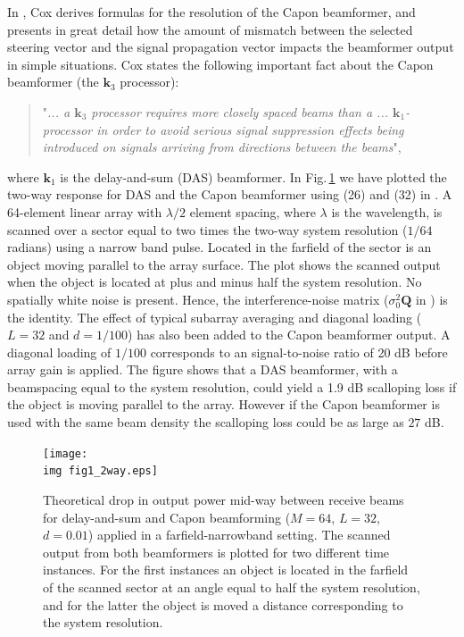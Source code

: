 \documentclass[journal]{IEEEtran}
\newcommand{\mat}[1]{\mathbf{#1}}
\renewcommand{\vec}[1]{\mathbf{#1}}
\newcommand{\img}{img/}
\begin{document}
In \cite{Cox1973}, Cox derives formulas for the resolution of the Capon beamformer, and presents in great detail how the amount of mismatch between the selected steering vector and the signal propagation vector impacts the beamformer output in simple situations. Cox states the following important fact about the Capon beamformer (the $\vec{k}_3$ processor): 
\begin{quote}
"\textit{... a $\vec{k}_3$ processor requires more closely spaced beams than a ... $\vec{k}_1$-processor in order to avoid serious signal suppression effects being introduced on signals arriving from directions between the beams}", 
\end{quote}
where $\vec{k}_1$ is the delay-and-sum (DAS) beamformer. In Fig.\,\ref{fig:das_capon_beams} we have plotted the two-way response for DAS and the Capon beamformer using (26) and (32) in \cite{Cox1973}. A 64-element linear array with $\lambda/2$ element spacing, where $\lambda$ is the wavelength, is scanned over a sector equal to two times the two-way system resolution ($1/64$ radians) using a narrow band pulse. Located in the farfield of the sector is an object moving parallel to the array surface. The plot shows the scanned output when the object is located at plus and minus half the system resolution. No spatially white noise is present. Hence, the interference-noise matrix ($\sigma_0^2\mat{Q}$ in \cite{Cox1973}) is the identity. The effect of typical subarray averaging and diagonal loading ($L=32$ and $d=1/100$) has also been added to the Capon beamformer output. A diagonal loading of $1/100$ corresponds to an signal-to-noise ratio of 20 dB before array gain is applied. The figure shows that a DAS beamformer, with a beamspacing equal to the system resolution, could yield a 1.9 dB scalloping loss \cite{Harris1978} if the object is moving parallel to the array. However if the Capon beamformer is used with the same beam density the scalloping loss could be as large as $27$ dB.

\begin{figure}[!t]
\centerline{
\texttt{[image: \\img fig1\_2way.eps]}
}
\caption{Theoretical drop in output power mid-way between receive beams for delay-and-sum and Capon beamforming ($M=64$, $L=32$, $d=0.01$) applied in a farfield-narrowband setting. The scanned output from both beamformers is plotted for two different time instances. For the first instances an object is located in the farfield of the scanned sector at an angle equal to half the system resolution, and for the latter the object is moved a distance corresponding to the system resolution.}
\label{fig:das_capon_beams}
\end{figure}
\end{document}
